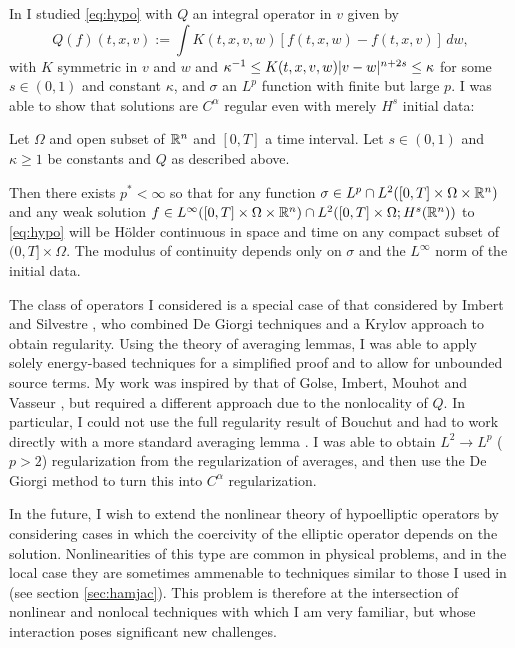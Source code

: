 In \cite{St.hypo} I studied \eqref{eq:hypo} with $Q$ an integral operator in $v$ given by
\[ Q(f)(t,x,v) := \int K(t,x,v,w) [f(t,x,w) - f(t,x,v)] \,dw, \]
with $K$ symmetric in $v$ and $w$ and $\kappa^{-1} \leq K(t,x,v,w)|v-w|^{n+2s} \leq \kappa$ for some $s \in (0,1)$ and constant $\kappa$, and $\sigma$ an $L^p$ function with finite but large $p$.  
I was able to show that solutions are $C^\alpha$ regular even with merely $H^s$ initial data:
\begin{theorem}
Let $\Omega$ and open subset of $\mathbb{R}^n$ and $[0,T]$ a time interval.  Let $s \in (0,1)$ and $\kappa \geq 1$ be constants and $Q$ as described above.  

Then there exists $p^* < \infty$ so that for any function $\sigma \in L^p \cap L^2([0,T] \times \Omega \times \mathbb{R}^n)$ and any weak solution $f \in L^\infty([0,T] \times \Omega \times \mathbb{R}^n) \cap L^2([0,T]\times\Omega; H^s(\mathbb{R}^n))$ to \eqref{eq:hypo} will be H\"{o}lder continuous in space and time on any compact subset of $(0,T]\times \Omega$.  The modulus of continuity depends only on $\sigma$ and the $L^\infty$ norm of the initial data.  
\end{theorem}
The class of operators I considered is a special case of that considered by Imbert and Silvestre \cite{ImSi}, who combined De Giorgi techniques and a Krylov approach to obtain regularity.  Using the theory of averaging lemmas, I was able to apply solely energy-based techniques for a simplified proof and to allow for unbounded source terms.  My work was inspired by that of Golse, Imbert, Mouhot and Vasseur \cite{GoImMoVa}, but required a different approach due to the nonlocality of $Q$.  In particular, I could not use the full regularity result of Bouchut and had to work directly with a more standard averaging lemma \cite{Be}.  I was able to obtain $L^2 \to L^p$ ($p>2$) regularization from the regularization of averages, and then use the De Giorgi method to turn this into $C^\alpha$ regularization.  

In the future, I wish to extend the nonlinear theory of hypoelliptic operators by considering cases in which the coercivity of the elliptic operator depends on the solution.  Nonlinearities of this type are common in physical problems, and in the local case they are sometimes ammenable to techniques similar to those I used in \cite{StVa.hamjac} (see section \ref{sec:hamjac}).  This problem is therefore at the intersection of nonlinear and nonlocal techniques with which I am very familiar, but whose interaction poses significant new challenges.  


